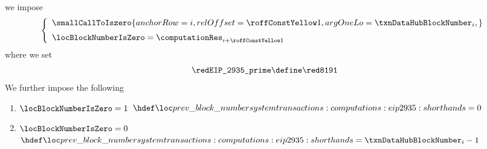 \item[\underline{\underline{Defining the ``previous block number'':}}]
	we impose
	\[
		\left\{ \begin{array}{l}
			\smallCallToIszero {
				anchorRow = i                                       ,
				relOffset = \previousBlockNumberDefinitionRowOffset ,
				argOneLo  = \txnDataHubBlockNumber _{i}             ,
			}
			\vspace{2mm} \\
			\locBlockNumberIsZero = \computationRes _{i + \previousBlockNumberDefinitionRowOffset} \\
		\end{array} \right.
	\]
	where we set
	\[
		\locBlockHashPrimeModulus \define \locBlockHashPrimeModulusValue
	\]
	We further impose the following
	\begin{enumerate}
	        \item \If $\locBlockNumberIsZero = 1$ \Then $\locPreviousBlockNumber = 0$
	        \item \If $\locBlockNumberIsZero = 0$ \Then $\locPreviousBlockNumber = \txnDataHubBlockNumber _{i} - 1$
	\end{enumerate}

